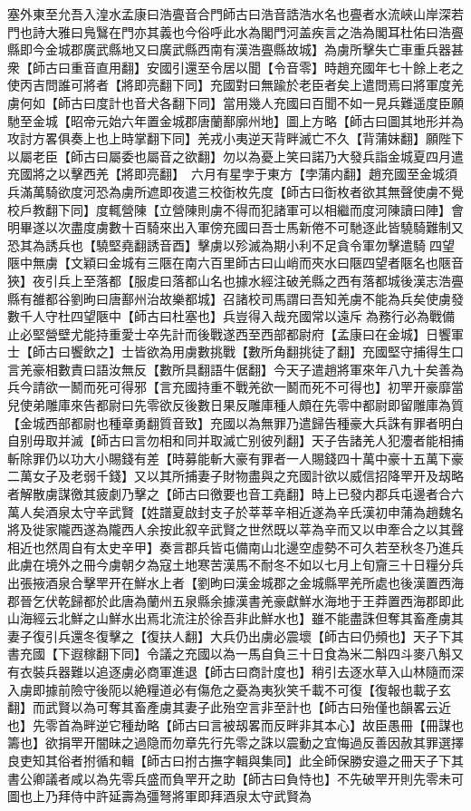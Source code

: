 塞外東至允吾入湟水孟康曰浩亹音合門師古曰浩音誥浩水名也亹者水流峽山岸深若門也詩大雅曰鳬鷖在門亦其義也今俗呼此水為閣門河盖疾言之浩為閣耳杜佑曰浩亹縣即今金城郡廣武縣地又曰廣武縣西南有漢浩亹縣故城】為虜所擊失亡車重兵器甚衆【師古曰重音直用翻】安國引還至令居以聞【令音零】時趙充國年七十餘上老之使丙吉問誰可將者【將即亮翻下同】充國對曰無踰於老臣者矣上遣問焉曰將軍度羌虜何如【師古曰度計也音犬各翻下同】當用幾人充國曰百聞不如一見兵難遥度臣願馳至金城【昭帝元始六年置金城郡唐蘭鄯廓州地】圖上方略【師古曰圖其地形并為攻討方畧俱奏上也上時掌翻下同】羌戎小夷逆天背畔滅亡不久【背蒲妹翻】願陛下以屬老臣【師古曰屬委也屬音之欲翻】勿以為憂上笑曰諾乃大發兵詣金城夏四月遣充國將之以擊西羌【將即亮翻】　六月有星孛于東方【孛蒲内翻】趙充國至金城須兵滿萬騎欲度河恐為虜所遮即夜遣三校衘枚先度【師古曰衘枚者欲其無聲使虜不覺校戶教翻下同】度輒營陳【立營陳則虜不得而犯諸軍可以相繼而度河陳讀曰陣】會明畢遂以次盡度虜數十百騎來出入軍傍充國曰吾士馬新倦不可馳逐此皆驍騎難制又恐其為誘兵也【驍堅堯翻誘音酉】擊虜以殄滅為期小利不足貪令軍勿擊遣騎四望陿中無虜【文穎曰金城有三陿在南六百里師古曰山峭而夾水曰陿四望者陿名也陿音狹】夜引兵上至落都【服䖍曰落都山名也據水經注破羌縣之西有落都城後漢志浩亹縣有雒都谷劉昫曰唐鄯州治故樂都城】召諸校司馬謂曰吾知羌虜不能為兵矣使虜發數千人守杜四望陿中【師古曰杜塞也】兵豈得入哉充國常以遠斥為務行必為戰備止必堅營壁尤能持重愛士卒先計而後戰遂西至西部都尉府【孟康曰在金城】日饗軍士【師古曰饗飲之】士皆欲為用虜數挑戰【數所角翻挑徒了翻】充國堅守捕得生口言羌豪相數責曰語汝無反【數所具翻語牛倨翻】今天子遣趙將軍來年八九十矣善為兵今請欲一鬭而死可得邪【言充國持重不戰羌欲一鬭而死不可得也】初䍐开豪靡當兒使弟雕庫來告都尉曰先零欲反後數日果反雕庫種人頗在先零中都尉即留雕庫為質【金城西部都尉也種章勇翻質音致】充國以為無罪乃遣歸告種豪大兵誅有罪者明白自别毋取并滅【師古曰言勿相和同并取滅亡别彼列翻】天子告諸羌人犯灋者能相捕斬除罪仍以功大小賜錢有差【時募能斬大豪有罪者一人賜錢四十萬中豪十五萬下豪二萬女子及老弱千錢】又以其所捕妻子財物盡與之充國計欲以威信招降䍐开及刼略者解散虜謀徼其疲劇乃擊之【師古曰徼要也音工堯翻】時上已發内郡兵屯邊者合六萬人矣酒泉太守辛武賢【姓譜夏啟封支子於莘莘辛相近遂為辛氏漢初申蒲為趙魏名將及徙家隴西遂為隴西人余按此叙辛武賢之世然既以莘為辛而又以申牽合之以其聲相近也然周自有太史辛甲】奏言郡兵皆屯備南山北邊空虛勢不可久若至秋冬乃進兵此虜在境外之冊今虜朝夕為寇土地寒苦漢馬不耐冬不如以七月上旬齎三十日糧分兵出張掖酒泉合擊䍐开在鮮水上者【劉昫曰漢金城郡之金城縣䍐羌所處也後漢置西海郡晉乞伏乾歸都於此唐為蘭州五泉縣余據漢書羌豪獻鮮水海地于王莽置西海郡即此山海經云北鮮之山鮮水出焉北流注於徐吾非此鮮水也】雖不能盡誅但奪其畜產虜其妻子復引兵還冬復擊之【復扶人翻】大兵仍出虜必震壞【師古曰仍頻也】天子下其書充國【下遐稼翻下同】令議之充國以為一馬自負三十日食為米二斛四斗麥八斛又有衣裝兵器難以追逐虜必商軍進退【師古曰商計度也】稍引去逐水草入山林隨而深入虜即據前險守後阨以絶糧道必有傷危之憂為夷狄笑千載不可復【復報也載子玄翻】而武賢以為可奪其畜產虜其妻子此殆空言非至計也【師古曰殆僅也韻畧云近也】先零首為畔逆它種劫略【師古曰言被刼畧而反畔非其本心】故臣愚冊【冊謀也籌也】欲捐䍐开闇昧之過隐而勿章先行先零之誅以震動之宜悔過反善因赦其罪選擇良吏知其俗者拊循和輯【師古曰拊古撫字輯與集同】此全師保勝安邉之冊天子下其書公卿議者咸以為先零兵盛而負䍐开之助【師古曰負恃也】不先破䍐开則先零未可圖也上乃拜侍中許延壽為彊弩將軍即拜酒泉太守武賢為